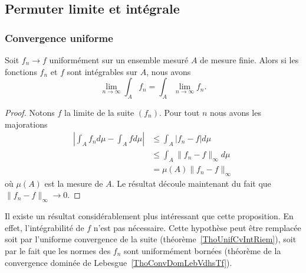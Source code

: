 \subsection{Permuter limite et intégrale}

\subsubsection{Convergence uniforme}

\begin{proposition}       \label{PropbhKnth}
    Soit \( f_n\to f\) uniformément sur un ensemble mesuré \( A\) de mesure finie. Alors si les fonctions \( f_n\) et \( f\) sont intégrables sur \( A\), nous avons
    \begin{equation}
        \lim_{n\to \infty} \int_A f_n=\int_A \lim_{n\to \infty} f_n.
    \end{equation}
\end{proposition}

\begin{proof}
    Notons \( f\) la limite de la suite \( (f_n)\). Pour tout \( n\) nous avons les majorations
    \begin{subequations}
        \begin{align}
            \left| \int_A f_n d\mu-\int_A fd\mu \right| &\leq \int_A| f_n-f |d\mu\\
            &\leq \int_A \| f_n-f \|_{\infty}d\mu\\
            &=\mu(A)\| f_n-f \|_{\infty}
        \end{align}
    \end{subequations}
    où \( \mu(A)\) est la mesure de \( A\). Le résultat découle maintenant du fait que \( \| f_n-f \|_{\infty}\to 0\).
\end{proof}
Il existe un résultat considérablement plus intéressant que cette proposition. En effet, l'intégrabilité de \( f\) n'est pas nécessaire. Cette hypothèse peut être remplacée soit par l'uniforme convergence de la suite (théorème~\ref{ThoUnifCvIntRiem}), soit par le fait que les normes des \( f_n\) sont uniformément bornées (théorème de la convergence dominée de Lebesgue~\ref{ThoConvDomLebVdhsTf}).


